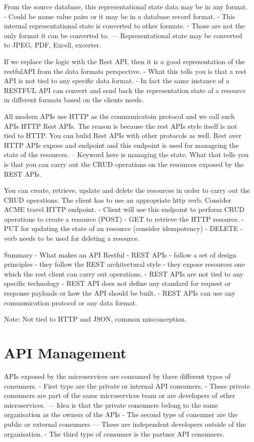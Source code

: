 From the source database, this representational state data may be in any format.
- Could be name value pairs or it may be in a database record format.
- This internal representational state is converted to other formats.
- Those are not the only format it can be converted to.
--- Representational state may be converted to JPEG, PDF, Excell, excerter.

If we replace the logic with the Rest API, then it is a good representation of the restfulAPI from the data formats perspective.
- What this tells you is that a rest API is not tied to any specific data format.
- In fact the same instance of a RESTFUL API can convert and send back the representation state af a resource in different formats based on the clients needs.

All modern APIs use HTTP as the communicatoin protocol and we call such APIs HTTP Rest APIs.
The reason is because the rest APIs style itself is not tied to HTTP.
You can bulid Rest APIs with other protocols as well.
Rest over HTTP APIs expose and endpoint and this endpoint is used for manageing the state of the resources.
-- Keyword here is managing the state.
What that tells you is that you can carry out the CRUD operations on the resources exposed by the REST APIs.

You can create, retrieve, update and delete the resources in order to carry out the CRUD operations.
The client has to use an appropriate http verb.
Consider ACME travel HTTP endpoint.
- Client will use this endpoint to perform CRUD operations to create a resource (POST)
- GET to retrieve the HTTP resource.
- PUT for updating the state of an resource (consider idempotency)
- DELETE - verb needs to be used for deleting a resource.

Summary - What makes an API Restful
- REST APIs - follow a set of design principles
- they follow the REST architectural style
- they expose resources one which the rest client can carry out operations.
- REST APIs are not tied to any specific technology
- REST API does not define any standard for request or response payloads or how the API should be built.
- REST APIs can use any communication protocol or any data format.

Note: Not tied to HTTP and JSON, common misconception.

\section{API Management}
APIs exposed by the microservices are consumed by three different types of consumers.
- First type are the private or internal API consumers.
- These private consumers are part of the same microservices team or are developers of other microservices.
--- Idea is that the private consumers belong to the same organisation as the owners of the APIs
- The second type of consumer are the public or external consumers
--- These are independent developers outside of the organisation.
- The third type of consumer is the partner API consumers.

